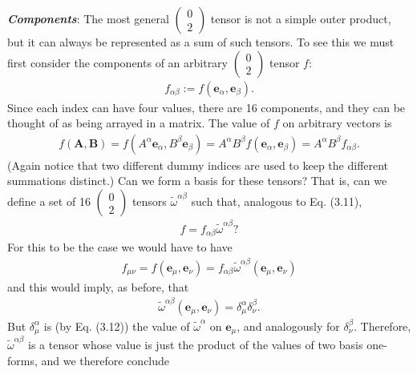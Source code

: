\documentclass[11pt,letterpaper]{book}
\begin{document}
    \textit{\textbf{Components}}: The most general \(\left(\begin{array}{c} 0 \\ 2 \end{array}\right)\) tensor is not a simple outer product, but it can always be represented as a sum of such tensors. To see this we must first consider the components of an arbitrary \(\left(\begin{array}{c} 0 \\ 2 \end{array}\right)\) tensor \(f\):
    \begin{align}
    f_{\alpha\beta} := f(\mathbf{e}_\alpha, \mathbf{e}_\beta). \tag{3.21}
    \end{align}
    Since each index can have four values, there are 16 components, and they can be thought of as being arrayed in a matrix. The value of \(f\) on arbitrary vectors is
    \begin{align}
    f(\mathbf{A},\mathbf{B}) = f(A^\alpha \mathbf{e}_\alpha, B^\beta \mathbf{e}_\beta)
    = A^\alpha B^\beta f(\mathbf{e}_\alpha, \mathbf{e}_\beta)
    = A^\alpha B^\beta f_{\alpha\beta}. \tag{3.22}
    \end{align}
    (Again notice that two different dummy indices are used to keep the different summations distinct.) Can we form a basis for these tensors? That is, can we define a set of 16 \(\left(\begin{array}{c} 0 \\ 2 \end{array}\right)\) tensors \(\tilde{\omega}^{\alpha\beta}\) such that, analogous to Eq. (3.11),
    \begin{align}
    f = f_{\alpha\beta} \tilde{\omega}^{\alpha\beta}? \tag{3.23}
    \end{align}
    For this to be the case we would have to have
    \begin{align}
    f_{\mu\nu} = f(\mathbf{e}_\mu, \mathbf{e}_\nu) = f_{\alpha\beta} \tilde{\omega}^{\alpha\beta}(\mathbf{e}_\mu, \mathbf{e}_\nu)
    \end{align}
    and this would imply, as before, that
    \begin{align}
    \tilde{\omega}^{\alpha\beta}(\mathbf{e}_\mu, \mathbf{e}_\nu) = \delta^\alpha_\mu \delta^\beta_\nu. \tag{3.24}
    \end{align}
    But \(\delta^\alpha_\mu\) is (by Eq. (3.12)) the value of \(\tilde{\omega}^\alpha\) on \(\mathbf{e}_\mu\), and analogously for \(\delta^\beta_\nu\). Therefore, \(\tilde{\omega}^{\alpha\beta}\) is a tensor whose value is just the product of the values of two basis one-forms, and we therefore conclude
\end{document}
